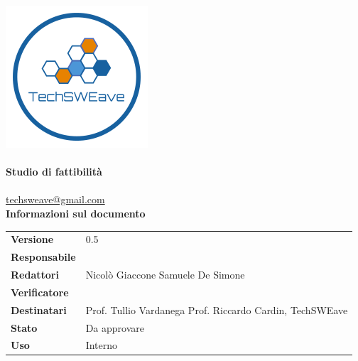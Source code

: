 \documentclass[a4paper]{article}
\begin{document}
\begin{titlepage}
    \begin{center}
        \includegraphics{../../../Images/logo}\\
        \vspace{20px}
        \textcolor{logo}{\hrulefill}\\
        \vspace{20px}
        \textbf{\huge\textcolor{logo}{Studio di fattibilità}}\\
        \vspace{10px}
        \textcolor{logo}{\hrulefill}\\
        \vspace{20px}
        \href{mailto:techsweave@gmail.com}{techsweave@gmail.com}\\
        \vspace{40px}
        \textbf{Informazioni sul documento}\\
        \vspace{20px}
        \begin{tabular}{p{100px} | p{100px}}
            \textbf{Versione} & 0.5\\
            \textbf{Responsabile} & \\
            \textbf{Redattori} & Nicolò Giaccone \newline Samuele De Simone\\
            \textbf{Verificatore} & \\
            \textbf{Destinatari} & Prof. Tullio Vardanega \newline Prof. Riccardo Cardin, \newline TechSWEave\\
            \textbf{Stato} & Da approvare\\
            \textbf{Uso} & Interno\\
        \end{tabular}
            \vspace{1ex}

    \end{center}
    \end{titlepage}
\end{document}
